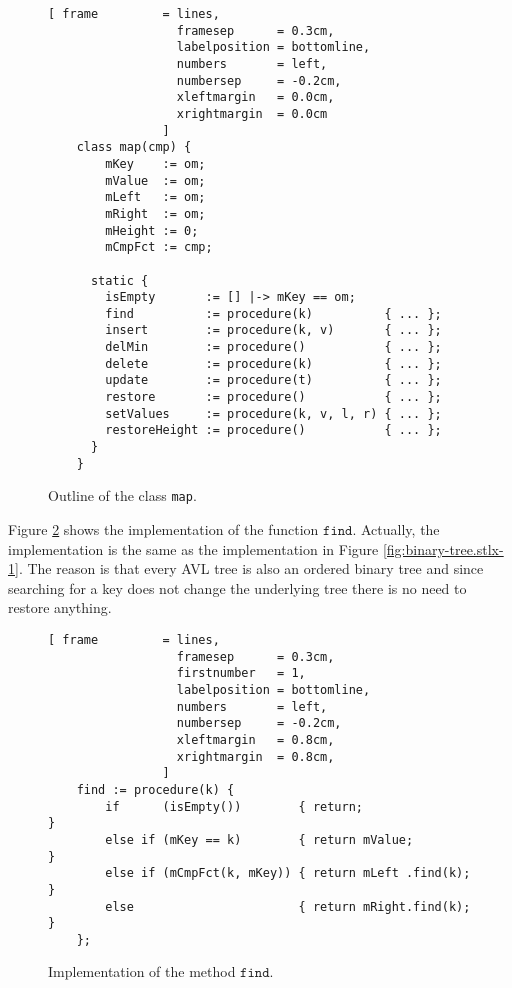 \begin{figure}[!ht]
  \centering
\begin{Verbatim}[ frame         = lines, 
                  framesep      = 0.3cm, 
                  labelposition = bottomline,
                  numbers       = left,
                  numbersep     = -0.2cm,
                  xleftmargin   = 0.0cm,
                  xrightmargin  = 0.0cm
                ]
    class map(cmp) {
        mKey    := om;
        mValue  := om; 
        mLeft   := om;
        mRight  := om;
        mHeight := 0;
        mCmpFct := cmp;  
    
      static {
        isEmpty       := [] |-> mKey == om;
        find          := procedure(k)          { ... };
        insert        := procedure(k, v)       { ... };
        delMin        := procedure()           { ... };
        delete        := procedure(k)          { ... };
        update        := procedure(t)          { ... };
        restore       := procedure()           { ... };
        setValues     := procedure(k, v, l, r) { ... };
        restoreHeight := procedure()           { ... };
      }
    }
\end{Verbatim}
\vspace*{-0.3cm}
  \caption{Outline of the class \texttt{map}.}
  \label{fig:avl-tree.stlx:outline}
\end{figure}


Figure \ref{fig:avl-tree.stlx:find} shows the implementation of the function $\mathtt{find}$.
Actually, the implementation is the same as the implementation in Figure
\ref{fig:binary-tree.stlx-1}.  The reason is that every AVL tree is also an ordered binary tree and
since searching for a key does not change the underlying tree there is no need to restore anything.

\begin{figure}[!ht]
\centering
\begin{Verbatim}[ frame         = lines, 
                  framesep      = 0.3cm, 
                  firstnumber   = 1,
                  labelposition = bottomline,
                  numbers       = left,
                  numbersep     = -0.2cm,
                  xleftmargin   = 0.8cm,
                  xrightmargin  = 0.8cm,
                ]
    find := procedure(k) {
        if      (isEmpty())        { return;                }
        else if (mKey == k)        { return mValue;         }
        else if (mCmpFct(k, mKey)) { return mLeft .find(k); }
        else                       { return mRight.find(k); }
    };
\end{Verbatim}
\vspace*{-0.3cm}
\caption{Implementation of the method $\mathtt{find}$.}
\label{fig:avl-tree.stlx:find}
\end{figure}


